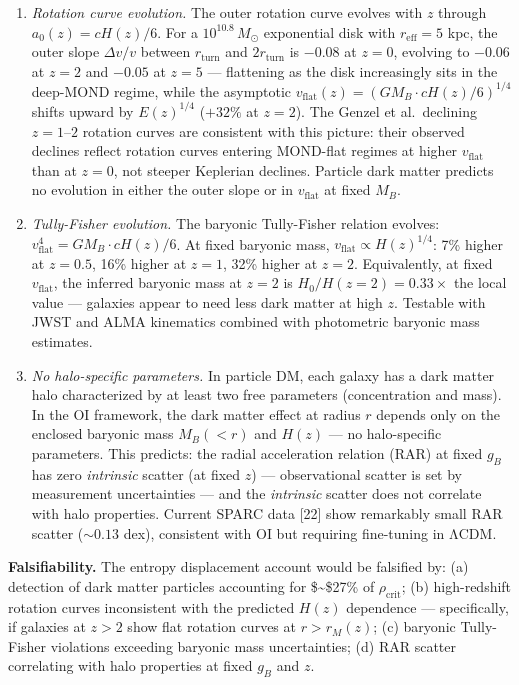 \documentclass[
]{article}
\begin{document}
\begin{enumerate}
\def\labelenumi{(\roman{enumi})}
\item
  \emph{Rotation curve evolution.} The outer rotation curve evolves with
  \(z\) through \(a_0(z) = cH(z)/6\). For a \(10^{10.8}\,M_\odot\)
  exponential disk with \(r_{\text{eff}} = 5\) kpc, the outer slope
  \(\Delta v / v\) between \(r_{\text{turn}}\) and \(2r_{\text{turn}}\)
  is \(-0.08\) at \(z = 0\), evolving to \(-0.06\) at \(z = 2\) and
  \(-0.05\) at \(z = 5\) --- flattening as the disk increasingly sits in
  the deep-MOND regime, while the asymptotic
  \(v_{\text{flat}}(z) = (GM_B \cdot cH(z)/6)^{1/4}\) shifts upward by
  \(E(z)^{1/4}\) (\(+32\%\) at \(z = 2\)). The Genzel et al.~declining
  \(z = 1\)--\(2\) rotation curves are consistent with this picture:
  their observed declines reflect rotation curves entering MOND-flat
  regimes at higher \(v_{\text{flat}}\) than at \(z = 0\), not steeper
  Keplerian declines. Particle dark matter predicts no evolution in
  either the outer slope or in \(v_{\text{flat}}\) at fixed \(M_B\).
\item
  \emph{Tully-Fisher evolution.} The baryonic Tully-Fisher relation
  evolves: \(v_{\text{flat}}^4 = GM_B \cdot cH(z)/6\). At fixed baryonic
  mass, \(v_{\text{flat}} \propto H(z)^{1/4}\): 7\% higher at
  \(z = 0.5\), 16\% higher at \(z = 1\), 32\% higher at \(z = 2\).
  Equivalently, at fixed \(v_{\text{flat}}\), the inferred baryonic mass
  at \(z = 2\) is \(H_0/H(z=2) = 0.33\times\) the local value ---
  galaxies appear to need less dark matter at high \(z\). Testable with
  JWST and ALMA kinematics combined with photometric baryonic mass
  estimates.
\item
  \emph{No halo-specific parameters.} In particle DM, each galaxy has a
  dark matter halo characterized by at least two free parameters
  (concentration and mass). In the OI framework, the dark matter effect
  at radius \(r\) depends only on the enclosed baryonic mass \(M_B(<r)\)
  and \(H(z)\) --- no halo-specific parameters. This predicts: the
  radial acceleration relation (RAR) at fixed \(g_B\) has zero
  \emph{intrinsic} scatter (at fixed \(z\)) --- observational scatter is
  set by measurement uncertainties --- and the \emph{intrinsic} scatter
  does not correlate with halo properties. Current SPARC data {[}22{]}
  show remarkably small RAR scatter (\(\sim 0.13\) dex), consistent with
  OI but requiring fine-tuning in ΛCDM.
\end{enumerate}

\textbf{Falsifiability.} The entropy displacement account would be
falsified by: (a) detection of dark matter particles accounting for
\$\sim\$27\% of \(\rho_{\text{crit}}\); (b) high-redshift rotation
curves inconsistent with the predicted \(H(z)\) dependence ---
specifically, if galaxies at \(z > 2\) show flat rotation curves at
\(r > r_M(z)\); (c) baryonic Tully-Fisher violations exceeding baryonic
mass uncertainties; (d) RAR scatter correlating with halo properties at
fixed \(g_B\) and \(z\).
\end{document}

